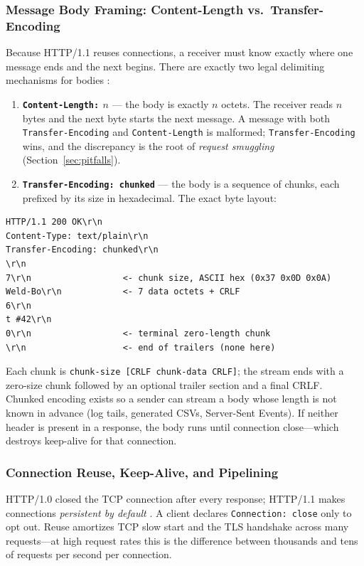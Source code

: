 \subsubsection{Message Body Framing: Content-Length vs.\ Transfer-Encoding}

Because HTTP/1.1 reuses connections, a receiver must know exactly where one message ends and the next begins. There are exactly two legal delimiting mechanisms for bodies \cite{rfc9112}:

\begin{enumerate}
  \item \textbf{\texttt{Content-Length:} $n$} --- the body is exactly $n$ octets. The receiver reads $n$ bytes and the next byte starts the next message. A message with both \texttt{Transfer-Encoding} and \texttt{Content-Length} is malformed; \texttt{Transfer-Encoding} wins, and the discrepancy is the root of \emph{request smuggling} (Section~\ref{sec:pitfalls}).
  \item \textbf{\texttt{Transfer-Encoding: chunked}} --- the body is a sequence of chunks, each prefixed by its size in hexadecimal. The exact byte layout:
\end{enumerate}

\begin{verbatim}
HTTP/1.1 200 OK\r\n
Content-Type: text/plain\r\n
Transfer-Encoding: chunked\r\n
\r\n
7\r\n                  <- chunk size, ASCII hex (0x37 0x0D 0x0A)
Weld-Bo\r\n            <- 7 data octets + CRLF
6\r\n
t #42\r\n
0\r\n                  <- terminal zero-length chunk
\r\n                   <- end of trailers (none here)
\end{verbatim}

Each chunk is \texttt{chunk-size [CRLF chunk-data CRLF]}; the stream ends with a zero-size chunk followed by an optional trailer section and a final CRLF. Chunked encoding exists so a sender can stream a body whose length is not known in advance (log tails, generated CSVs, Server-Sent Events). If neither header is present in a response, the body runs until connection close---which destroys keep-alive for that connection.

\subsubsection{Connection Reuse, Keep-Alive, and Pipelining}

HTTP/1.0 closed the TCP connection after every response; HTTP/1.1 makes connections \emph{persistent by default} \cite{rfc9112}. A client declares \texttt{Connection: close} only to opt out. Reuse amortizes TCP slow start and the TLS handshake across many requests---at high request rates this is the difference between thousands and tens of requests per second per connection.

